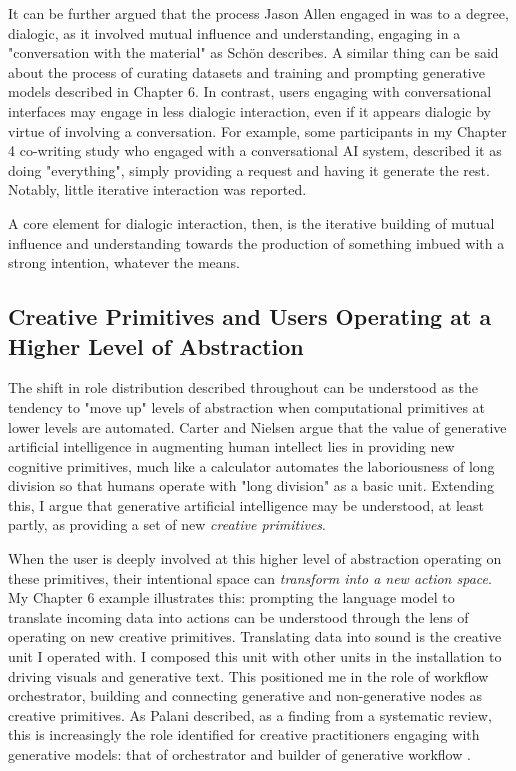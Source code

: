 It can be further argued that the process Jason Allen engaged in was to a degree, dialogic, as it involved mutual influence and understanding, engaging in a "conversation with the material" as Schön describes. A similar thing can be said about the process of curating datasets and training and prompting generative models described in Chapter 6. In contrast, users engaging with conversational interfaces may engage in less dialogic interaction, even if it appears dialogic by virtue of involving a conversation. For example, some participants in my Chapter 4 co-writing study who engaged with a conversational AI system, described it as doing "everything", simply providing a request and having it generate the rest. Notably, little iterative interaction was reported. 

A core element for dialogic interaction, then, is the iterative building of mutual influence and understanding towards the production of something imbued with a strong intention, whatever the means. 

\subsection{Creative Primitives and Users Operating at a Higher Level of Abstraction}

The shift in role distribution described throughout can be understood as the tendency to "move up" levels of abstraction when computational primitives at lower levels are automated. Carter and Nielsen \cite{Carter2017-xj} argue that the value of generative artificial intelligence in augmenting human intellect lies in providing new cognitive primitives, much like a calculator automates the laboriousness of long division so that humans operate with "long division" as a basic unit. Extending this, I argue that generative artificial intelligence may be understood, at least partly, as providing a set of new \textit{creative primitives}.

When the user is deeply involved at this higher level of abstraction operating on these primitives, their intentional space can \textit{transform into a new action space}. My Chapter 6 example illustrates this: prompting the language model to translate incoming data into actions can be understood through the lens of operating on new creative primitives. Translating data into sound is the creative unit I operated with. I composed this unit with other units in the installation to driving visuals and generative text. This positioned me in the role of workflow orchestrator, building and connecting generative and non-generative nodes as creative primitives. As Palani described, as a finding from a systematic review, this is increasingly the role identified for creative practitioners engaging with generative models: that of orchestrator and builder of generative workflow \cite{Palani2024-on}. 

